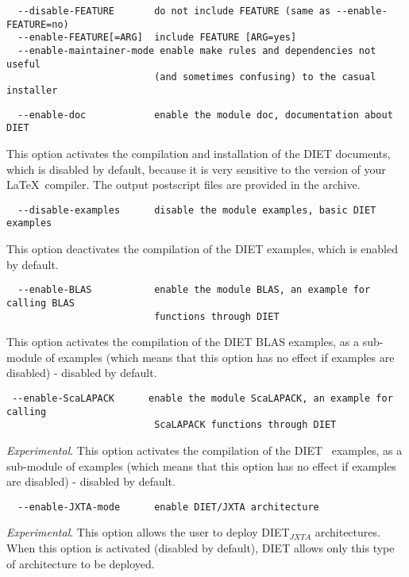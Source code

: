 {\footnotesize
\begin{verbatim}
  --disable-FEATURE       do not include FEATURE (same as --enable-FEATURE=no)
  --enable-FEATURE[=ARG]  include FEATURE [ARG=yes]
  --enable-maintainer-mode enable make rules and dependencies not useful
                          (and sometimes confusing) to the casual installer
\end{verbatim}

\begin{verbatim}
  --enable-doc            enable the module doc, documentation about DIET
\end{verbatim}
}
\noindent This option activates the compilation and installation of
the DIET documents, which is disabled by default, because it is very
sensitive to the version of your \LaTeX\ compiler. The output
postscript files are provided in the archive.

{\footnotesize
\begin{verbatim}
  --disable-examples      disable the module examples, basic DIET examples
\end{verbatim}
}
\noindent This option deactivates the compilation of the DIET
examples, which is enabled by default.

{\footnotesize
\begin{verbatim}
  --enable-BLAS           enable the module BLAS, an example for calling BLAS
                          functions through DIET
\end{verbatim}
}
\noindent This option activates the compilation of the DIET BLAS
examples, as a sub-module of examples (which means that this option
has no effect if examples are disabled) - disabled by default.


{\footnotesize
\begin{verbatim}
 --enable-ScaLAPACK      enable the module ScaLAPACK, an example for calling
                          ScaLAPACK functions through DIET
\end{verbatim}
}
\noindent \textit{Experimental}.  This option activates the
compilation of the DIET \scalapack\ examples, as a sub-module of
examples (which means that this option has no effect if examples are
disabled) - disabled by default.

{\footnotesize
\begin{verbatim}
  --enable-JXTA-mode      enable DIET/JXTA architecture
\end{verbatim}
}
\noindent \textit{Experimental}.  This option allows the user to
deploy DIET$_{JXTA}$ architectures.  When this option is activated
(disabled by default), DIET allows only this type of architecture to
be deployed.

